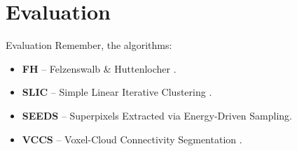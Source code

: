 \documentclass[handout]{beamer}
\begin{document}
	\section{Evaluation}
	\begin{frame}{Evaluation}
		Remember, the algorithms:
		\vskip 0.25cm
		\begin{itemize}[leftmargin=0cm]
			\item \textbf{FH} -- Felzenswalb \& Huttenlocher \cite{FelzenswalbHuttenlocher:2004}.
			\item \textbf{SLIC} -- Simple Linear Iterative Clustering \cite{AchantaShajiSmithLucchiFuaSuesstrunk:2010}.
			\item \textbf{SEEDS} -- Superpixels Extracted via Energy-Driven Sampling.
			\item \textbf{VCCS} -- Voxel-Cloud Connectivity Segmentation \cite{PaponAbramovSchoelerWoergoetter:2013}.
		\end{itemize}
	\end{frame}
	
\end{document}
